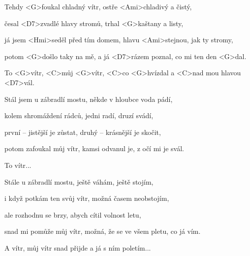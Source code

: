 

\zs
Tehdy <G>foukal chladný vítr, ostře <Ami>chladivý a čistý,

česal <D7>zvadlé hlavy stromů, trhal <G>kaštany a listy,

já jsem <Hmi>seděl před tím domem, hlavu <Ami>stejnou, jak ty stromy,

potom <G>došlo taky na mě, a já <D7>rázem poznal, co mi ten den <G>dal.
\ks

\zr
To <G>vítr, <C>můj <G>vítr, <C>co <G>hvízdal a <C>nad mou hlavou <D7>vál.
\kr

\zs
Stál jsem u zábradlí mostu, někde v hloubce voda pádí,

kolem shromáždení rádců, jedni radí, druzí svádí,

první – jistější je zůstat, druhý – krásnější je skočit,

potom zafoukal můj vítr, kamsi odvanul je, z očí mi je svál.
\ks

\zr
To vítr...
\kr

\zs
Stále u zábradlí mostu, ještě váhám, ještě stojím,

i když potkám ten svůj vítr, možná časem neobstojím,

ale rozhodnu se brzy, abych cítil volnost letu,

snad mi pomůže můj vítr, možná, že se ve všem pletu, co já vím.
\ks

\zr
A vítr, můj vítr snad přijde a já s ním poletím...
\kr

\kp
